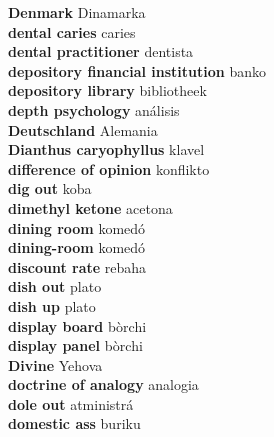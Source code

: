 \textbf{ Denmark  } Dinamarka \\
\textbf{ dental caries  } caries \\
\textbf{ dental practitioner  } dentista \\
\textbf{ depository financial institution  } banko \\
\textbf{ depository library  } bibliotheek \\
\textbf{ depth psychology  } análisis \\
\textbf{ Deutschland  } Alemania \\
\textbf{ Dianthus caryophyllus  } klavel \\
\textbf{ difference of opinion  } konflikto \\
\textbf{ dig out  } koba \\
\textbf{ dimethyl ketone  } acetona \\
\textbf{ dining room  } komedó \\
\textbf{ dining-room  } komedó \\
\textbf{ discount rate  } rebaha \\
\textbf{ dish out  } plato \\
\textbf{ dish up  } plato \\
\textbf{ display board  } bòrchi \\
\textbf{ display panel  } bòrchi \\
\textbf{ Divine  } Yehova \\
\textbf{ doctrine of analogy  } analogia \\
\textbf{ dole out  } atministrá \\
\textbf{ domestic ass  } buriku \\
